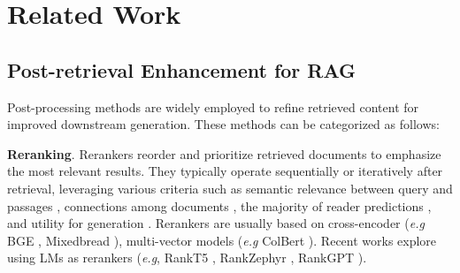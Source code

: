 \section{Related Work}
\subsection{Post-retrieval Enhancement for RAG}
Post-processing methods are widely employed to refine retrieved content for improved downstream generation. These methods can be categorized as follows:

\textbf{Reranking}. Rerankers reorder and prioritize retrieved documents to emphasize the most relevant results. They typically operate sequentially or iteratively after retrieval, leveraging various criteria such as semantic relevance between query and passages \cite{glass-etal-2022-re2g, hofstatter2023fid}, connections among documents \cite{dong2024don}, the majority of reader predictions \cite{mao-etal-2021-reader}, and utility for generation \cite{ma-etal-2023-large}. Rerankers are usually based on cross-encoder (\emph{e.g} BGE \cite{bgeembedding}, Mixedbread \cite{li2023angle}), multi-vector models (\emph{e.g} ColBert \cite{khattab2020colbert, santhanam-etal-2022-colbertv2}). Recent works explore using LMs as rerankers (\emph{e.g}, RankT5 \cite{zhuang2023rankt5}, RankZephyr \cite{pradeep2023rankzephyr}, RankGPT \cite{sun-etal-2023-chatgpt}).  

